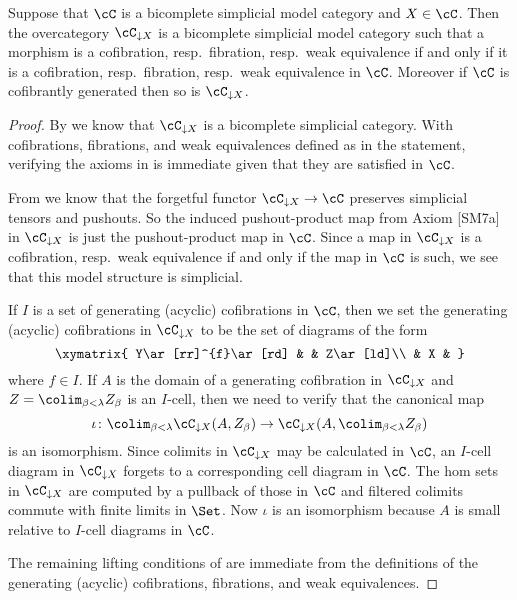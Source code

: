 \documentclass[leqno,oneside,english]{elsarticle}
\newcounter{enumisaved}
\newlength{\thmsaved}
\newlength{\thmnow}
\begin{document}
{{{\begin{prop*}\label{prop:overcategory-is-a-model-category}
  Suppose that $\cC$ is a bicomplete simplicial model category and
  $X\in \cC$. Then the overcategory $\cC_{\downarrow X}$ is a
  bicomplete simplicial model category such that a morphism is a
  cofibration, resp.~fibration, resp.~weak equivalence if and only if
  it is a cofibration, resp.~fibration, resp.~weak equivalence in
  $\cC$. Moreover if $\cC$ is cofibrantly generated then so is
  $\cC_{\downarrow X}$.
\end{prop*}
\begin{proof}

  By  we know that
  $\cC_{\downarrow X}$ is a bicomplete simplicial category. With
  cofibrations, fibrations, and weak equivalences defined as in the
  statement, verifying the axioms in  is
  immediate given that they are satisfied in $\cC$.

  From  we know that the
  forgetful functor $\cC_{\downarrow X}\rightarrow \cC$ preserves
  simplicial tensors and pushouts. So the induced pushout-product map
  from Axiom [SM7a] in $\cC_{\downarrow X}$ is just the
  pushout-product map in $\cC$.  Since a map in $\cC_{\downarrow X}$
  is a cofibration, resp.~weak equivalence if and only if the map in
  $\cC$ is such, we see that this model structure is simplicial.

  If $I$ is a set of generating (acyclic) cofibrations in $\cC$, then
  we set the generating (acyclic) cofibrations in $\cC_{\downarrow X}$
  to be the set of diagrams of the form 
  \[ \xymatrix{ Y\ar[rr]^{f}\ar[rd] & & Z\ar[ld]\\ & X & } \]
  where $f\in I$. If $A$ is the domain of a generating cofibration in
  $\cC_{\downarrow X}$ and $Z=\colim_{\beta<\lambda} Z_{\beta}$ is an
  $I$-cell, then we need to verify that the canonical map
  \[
  \iota\colon \colim_{\beta<\lambda}\cC_{\downarrow X}(A,Z_{\beta})\rightarrow
  \cC_{\downarrow X}(A,\colim_{\beta<\lambda}Z_{\beta})
  \] 
  is an isomorphism. Since colimits in $\cC_{\downarrow X}$ may be
  calculated in $\cC$, an $I$-cell diagram in $\cC_{\downarrow X}$
  forgets to a corresponding cell diagram in $\cC$.  The hom sets in
  $\cC_{\downarrow X}$ are computed by a pullback of those in $\cC$
  and filtered colimits commute with finite limits in $\Set$. Now
  $\iota$ is an isomorphism because $A$ is small relative to $I$-cell
  diagrams in $\cC$.

  The remaining lifting conditions of 
  are immediate from the definitions of the generating (acyclic)
  cofibrations, fibrations, and weak equivalences.
\end{proof}
}
  {}
  \ 
  \ifthenelse{\lengthtest{\thmnow > \thmsaved}}{
    
    \setcounter{thm}{{\strip@pt{\thmsaved}}}  
  }{
    
  }
  \setcounter{enumi}{\theenumisaved}
    \else  \fi
}}{}
\end{document}
